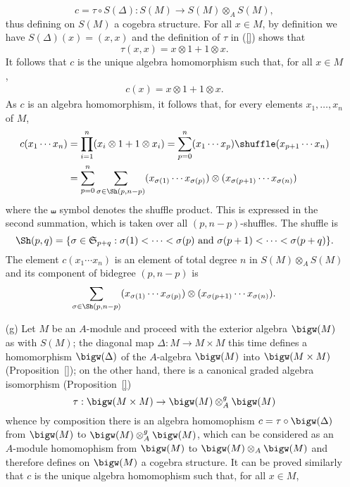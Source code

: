 \begin{example}
\begin{itemize}
\[c=\tau\circ S(\Delta):S(M)\to S(M)\otimes_AS(M),\]
thus defining on $S(M)$ a cogebra structure. For all $x\in M$, by definition we have $S(\Delta)(x)=(x,x)$ and the definition of $\tau$ in (\ref{}) shows that
\[\tau(x,x)=x\otimes 1+1\otimes x.\]
It follows that $c$ is the unique algebra homomorphism such that, for all $x\in M$,
\begin{align}\label{symmetric algebra coproduct-1}
c(x)=x\otimes 1+1\otimes x.
\end{align}
As $c$ is an algebra homomorphism, it follows that, for every elements $x_1,\dots,x_n$ of $M$,
\begin{equation}
\begin{aligned}\label{symmetric algebra coproduct-2}
c(x_1\cdots x_n)&=\prod_{i=1}^{n}(x_i\otimes 1+1\otimes x_i)=\sum_{p=0}^{n}(x_1\cdots x_p)\shuffle(x_{p+1}\cdots x_n)\\
&=\sum_{p=0}^{n}\sum_{\sigma\in\Sh(p,n-p)}(x_{\sigma(1)}\cdots x_{\sigma(p)})\otimes(x_{\sigma(p+1)}\cdots x_{\sigma(n)})
\end{aligned}
\end{equation}
where the $\shuffle$ symbol denotes the shuffle product. This is expressed in the second summation, which is taken over all $(p,n-p)$-shuffles. The shuffle is
\[\Sh(p,q)=\{\sigma\in\mathfrak{S}_{p+q}:\text{$\sigma(1)<\cdots<\sigma(p)$ and $\sigma(p+1)<\cdots<\sigma(p+q)$}\}.\]
The element $c(x_1\cdots x_n)$ is an element of total degree $n$ in $S(M)\otimes_AS(M)$ and its component of bidegree $(p,n-p)$ is
\begin{align}\label{symmetric algebra coproduct-3}
\sum_{\sigma\in\Sh(p,n-p)}(x_{\sigma(1)}\cdots x_{\sigma(p)})\otimes(x_{\sigma(p+1)}\cdots x_{\sigma(n)}).
\end{align}
\item[(g)] Let $M$ be an $A$-module and proceed with the exterior algebra $\bigw(M)$ as with $S(M)$; the diagonal map $\Delta:M\to M\times M$ this time defines a homomorphism $\bigw(\Delta)$ of the $A$-algebra $\bigw(M)$ into $\bigw(M\times M)$ (Proposition~\ref{}); on the other hand, there is a canonical graded algebra isomorphism (Proposition~\ref{})
\[\tau:\bigw(M\times M)\to\bigw(M)\otimes_A^g\bigw(M)\]
whence by composition there is an algebra homomophism $c=\tau\circ\bigw(\Delta)$ from $\bigw(M)$ to $\bigw(M)\otimes_A^g\bigw(M)$, which can be considered as an $A$-module homomophism from $\bigw(M)$ to $\bigw(M)\otimes_A\bigw(M)$ and therefore defines on $\bigw(M)$ a cogebra structure. It can be proved similarly that $c$ is the unique algebra homomophism such that, for all $x\in M$,

\end{itemize}
\end{example}
